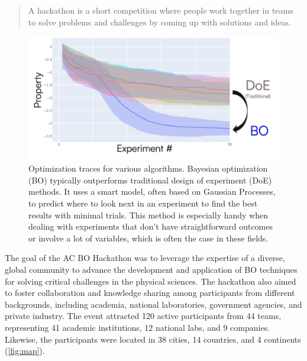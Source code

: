 \documentclass[superscriptaddress, nofootinbib,  amsmath, amssymb, twocolumn]{revtex4-2}
\begin{document}
\begin{quote}
A hackathon is a short competition where people work together in teams to solve problems and challenges by coming up with solutions and ideas.
\end{quote}

\begin{figure}
    \centering
    \includegraphics[width=1\linewidth]{latex/figures/intro-bo.png}
    \caption{Optimization traces for various algorithms. Bayesian optimization (BO) typically outperforms traditional design of experiment (DoE) methods. It uses a smart model, often based on Gaussian Processes, to predict where to look next in an experiment to find the best results with minimal trials. This method is especially handy when dealing with experiments that don’t have straightforward outcomes or involve a lot of variables, which is often the case in these fields.}
    \label{fig:intro-bo}
\end{figure}


The goal of the AC BO Hackathon was to leverage the expertise of a diverse, global community to advance the development and application of BO techniques for solving critical challenges in the physical sciences. The hackathon also aimed to foster collaboration and knowledge sharing among participants from different backgrounds, including academia, national laboratories, government agencies, and private industry. The event attracted 120 active participants from 44 teams, representing 41 academic institutions, 12 national labs, and 9 companies. Likewise, the participants were located in 38 cities, 14 countries, and 4 continents (\cref{fig:map}).
\end{document}
